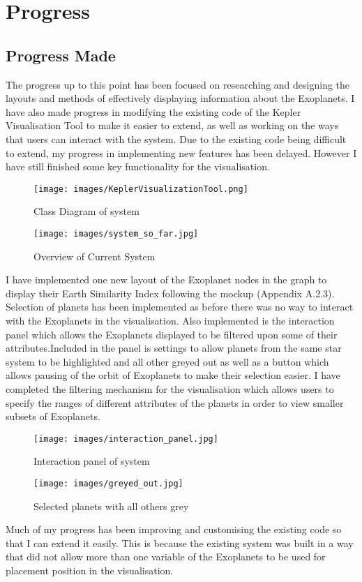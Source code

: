 \documentclass[11pt
              , a4paper
              , twoside
              , openright
              ]{report}
\begin{document}
\chapter{Progress}
\section{Progress Made}
The progress up to this point has been focused on researching and designing the
layouts and methods of effectively displaying information about the Exoplanets.
I have also made progress in modifying the existing code of the Kepler
Visualisation Tool \cite{kepler_github} to make it easier to extend, as well as
working on the ways that users can interact with the system. Due to the existing
code being difficult to extend, my progress in implementing new features has
been delayed. However I have still finished some key functionality for the
visualisation.


\begin{figure}[h!]
  \centering
      \texttt{[image: images/KeplerVisualizationTool.png]}
  \caption{Class Diagram of system}
\end{figure}
\begin{figure}[h!]
  \centering
      \texttt{[image: images/system\_so\_far.jpg]}
  \caption{Overview of Current System}
\end{figure}
I have implemented one new layout of the Exoplanet nodes in the graph to display
their Earth Similarity Index following the mockup (Appendix A.2.3). Selection of
planets has been implemented as before there was no way to interact with the
Exoplanets in the visualisation. Also implemented is the interaction panel which
allows the Exoplanets displayed to be filtered upon some of their
attributes.Included in the panel is settings to allow planets from the same star
system to be highlighted and all other greyed out as well as a button which
allows pausing of the orbit of Exoplanets to make their selection easier. I have
completed the filtering mechanism for the visualisation which allows users to
specify the ranges of different attributes of the planets in order to view
smaller subsets of Exoplanets.

\begin{figure}[h!]
  \centering
      \texttt{[image: images/interaction\_panel.jpg]}
  \caption{Interaction panel of system}
\end{figure}

\begin{figure}[h!]
  \centering
      \texttt{[image: images/greyed\_out.jpg]}
  \caption{Selected planets with all others grey}
\end{figure}
Much of my progress has been improving and customising the existing code so that
I can extend it easily. This is because the existing system was built in a way
that did not allow more than one variable of the Exoplanets to be used for
placement position in the visualisation.
\end{document}
